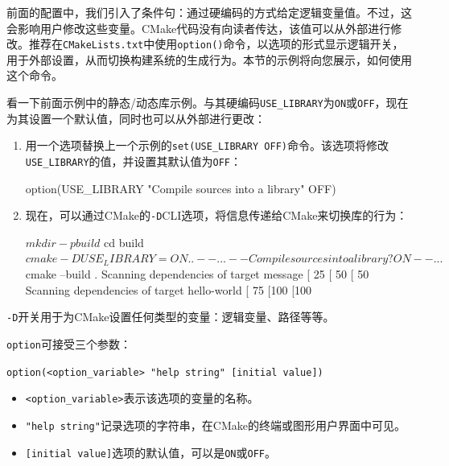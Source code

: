 前面的配置中，我们引入了条件句：通过硬编码的方式给定逻辑变量值。不过，这会影响用户修改这些变量。CMake代码没有向读者传达，该值可以从外部进行修改。推荐在\texttt{CMakeLists.txt}中使用\texttt{option()}命令，以选项的形式显示逻辑开关，用于外部设置，从而切换构建系统的生成行为。本节的示例将向您展示，如何使用这个命令。


看一下前面示例中的静态/动态库示例。与其硬编码\texttt{USE\_LIBRARY}为\texttt{ON}或\texttt{OFF}，现在为其设置一个默认值，同时也可以从外部进行更改：

\begin{enumerate}
\item 用一个选项替换上一个示例的\texttt{set(USE\_LIBRARY OFF)}命令。该选项将修改\texttt{USE\_LIBRARY}的值，并设置其默认值为\texttt{OFF}：

\begin{codebox}[cmake]
option(USE_LIBRARY "Compile sources into a library" OFF)
\end{codebox}

\item 现在，可以通过CMake的\texttt{-D}CLI选项，将信息传递给CMake来切换库的行为：

\begin{codebox}[shell]
$ mkdir -p build
$ cd build
$ cmake -D USE_LIBRARY=ON ..
-- ...
-- Compile sources into a library? ON
-- ...
$ cmake --build .
Scanning dependencies of target message
[ 25%
[ 50%
[ 50%
Scanning dependencies of target hello-world
[ 75%
[100%
[100%
\end{codebox}

\end{enumerate}

\texttt{-D}开关用于为CMake设置任何类型的变量：逻辑变量、路径等等。


\texttt{option}可接受三个参数：

\texttt{option(<option\_variable> "help string" [initial value])}

\begin{itemize}
\item \texttt{<option\_variable>}表示该选项的变量的名称。

\item \texttt{"help string"}记录选项的字符串，在CMake的终端或图形用户界面中可见。

\item \texttt{[initial value]}选项的默认值，可以是\texttt{ON}或\texttt{OFF}。

\end{itemize}

